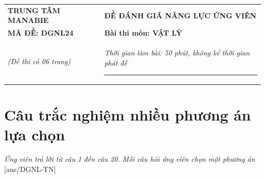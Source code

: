 \begin{center}
	\begin{tabular}{M{6.5cm}M{11cm}}
		\textbf{TRUNG TÂM MANABIE}& \textbf{ĐỀ ĐÁNH GIÁ NĂNG LỰC ỨNG VIÊN}\\
		\textbf{MÃ ĐỀ: DGNL24}& \textbf{Bài thi môn: VẬT LÝ}\\
		\textit{(Đề thi có 06 trang)}& \textit{Thời gian làm bài: 50 phút, không kể thời gian phát đề}
		
		\noindent\rule{2cm}{0.8pt} \\
	\end{tabular}
\end{center}
\setcounter{section}{0}
\section{Câu trắc nghiệm nhiều phương án lựa chọn}
\textit{Ứng viên trả lời từ câu 1 đến câu 20. Mỗi câu hỏi ứng viên chọn một phương án}
\setcounter{ex}{0}
[ans/DGNL-TN]

